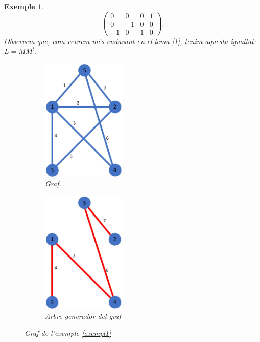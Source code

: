 \documentclass{article}
\newtheorem{example}{Exemple}[section]
\begin{document}
\begin{example}
$$\begin{pmatrix}
            0 & 0 & 0 & 1 \\
            0 & -1 & 0 & 0 \\
            -1 & 0 & 1 & 0
        \end{pmatrix}.
        $$
        Observem que, com veurem més endavant en el lema \ref{1}, tenim aquesta igualtat: $L=MM^t$.
        \begin{figure}[H]
    \centering
    \begin{subfigure}{.45\textwidth}
        \centering
        \includegraphics[width=4cm]{imatges/exemple1.jpg}
        \caption{Graf.}
        \label{g1}
    \end{subfigure}
    \begin{subfigure}{.45\textwidth}
        \centering
        \includegraphics[width=4cm]{imatges/exemple2.jpg}
        \caption{Arbre generador del graf}
        \label{g2}
    \end{subfigure}
    \caption{Graf de l'exemple \ref{exempl1}}
\end{figure}
    \end{example}
\end{document}
